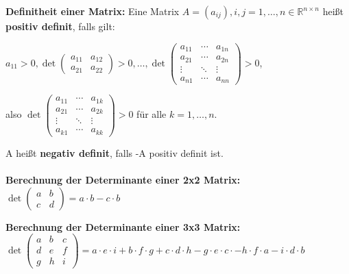 \documentclass[fontset=ubuntu,12pt,a4paper,fleqn]{article}
\begin{document}
\textbf{Definitheit einer Matrix:} 
Eine Matrix \(A=(a_{ij}), i,j=1,\dots,n \in \mathbb{R}^{n\times n}\) heißt \textbf{positiv definit}, falls gilt:
{\fontsize{9}{10}
\begin{multicols}{2}
\(a_{11}>0,\det\begin{pmatrix}
a_{11} & a_{12} \\ a_{21} & a_{22}
\end{pmatrix} > 0, \dots, \det\begin{pmatrix}
a_{11} & \cdots & a_{1n} \\
a_{21} & \cdots & a_{2n} \\
\vdots & \ddots & \vdots \\
a_{n1} & \cdots & a_{nn}
\end{pmatrix} > 0\), 

also \(\det\begin{pmatrix}
a_{11} & \cdots & a_{1k} \\
a_{21} & \cdots & a_{2k} \\
\vdots & \ddots & \vdots \\
a_{k1} & \cdots & a_{kk}
\end{pmatrix} > 0\) für alle \(k=1,\dots,n\).

A heißt \textbf{negativ definit}, falls -A positiv definit ist.
\\\\

\textbf{Berechnung der Determinante einer 2x2 Matrix:} 
\(\det\begin{pmatrix}
a & b  \\ c & d
\end{pmatrix}
=  a\cdot b - c\cdot b\)

\textbf{Berechnung der Determinante einer 3x3 Matrix:} 
\(\det\begin{pmatrix}
a & b & c  \\ d & e & f \\ g & h & i
\end{pmatrix}
=  a \cdot e \cdot i + b \cdot f \cdot g + c \cdot d \cdot h - g\cdot e\cdot c\cdot - h\cdot f\cdot a - i\cdot d\cdot b\)
\end{multicols}}



    
\end{document}
